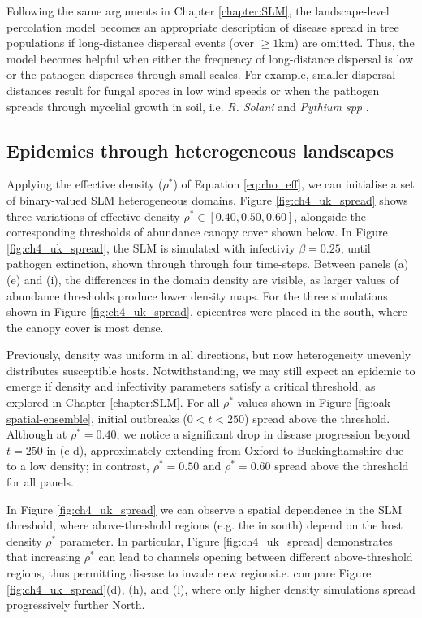 Following the same arguments in Chapter \ref{chapter:SLM}, the landscape-level percolation model becomes an appropriate description of disease spread in tree populations if long-distance dispersal events (over $\geq 1 \mathrm{km}$) are omitted. Thus, the model becomes helpful when either the frequency of long-distance dispersal is low or the pathogen disperses through small scales. For example, smaller dispersal distances result for fungal spores in low wind speeds \cite{viljanen2007monitoring, solheim2017spread} or when the pathogen spreads through mycelial growth in soil, i.e. \textit{R. Solani} and \textit{Pythium spp} \cite{otten2004empirical, poggi2013percolation}. 

\subsection{Epidemics through heterogeneous landscapes}

Applying the effective density ($\rho^{*}$) of Equation \ref{eq:rho_eff},
we can initialise a set of binary-valued SLM heterogeneous domains. 
Figure \ref{fig:ch4_uk_spread} shows three variations of effective density
$\rho^{*} \in [0.40, 0.50, 0.60]$, alongside the corresponding thresholds of
abundance canopy cover shown below. In Figure \ref{fig:ch4_uk_spread}, the SLM
is simulated with infectiviy $\beta=0.25$, until pathogen extinction, 
shown through through four time-steps. Between panels (a) (e) and (i), 
the differences in the domain density are visible,
as larger values of abundance thresholds produce lower density maps.
For the three simulations shown in Figure \ref{fig:ch4_uk_spread}, 
epicentres were placed in the south, where the canopy cover is most dense. 

Previously, density was uniform in all directions, 
but now heterogeneity unevenly distributes susceptible hosts. 
Notwithstanding, we may still expect an epidemic to emerge if density 
and infectivity parameters satisfy a critical threshold, as explored in Chapter \ref{chapter:SLM}.
For all $\rho^*$ values shown in Figure \ref{fig:oak-spatial-ensemble}, 
initial outbreaks ($0<t<250$) spread above the threshold.
Although at $\rho^*=0.40$, we notice a significant drop in disease progression 
beyond $t=250$ in (c-d), approximately extending from Oxford to Buckinghamshire due to a low density;
in contrast, $\rho^*=0.50$ and $\rho^*=0.60$ spread above the threshold for all panels.

In Figure \ref{fig:ch4_uk_spread} we can observe a spatial dependence in the SLM threshold,
where above-threshold regions (e.g. the in south) depend on the host density $\rho^*$ parameter.
In particular, Figure \ref{fig:ch4_uk_spread} demonstrates that increasing $\rho^*$ can lead to channels opening between different above-threshold regions, thus permitting disease to invade new regions\textemdash i.e. compare Figure \ref{fig:ch4_uk_spread}(d), (h), and (l), where only higher density simulations spread progressively further North.

